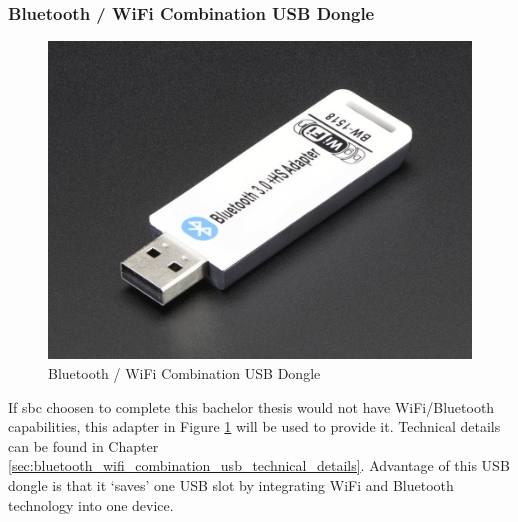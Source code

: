 \subsubsection{Bluetooth / WiFi Combination USB Dongle} %
\label{ssub:bluetooth_wifi_combination_usb_dongle}
\begin{figure}[H]
\begin{center}
\captionsetup{font=small}
\includegraphics[scale=0.2]{pics/dongle.jpg}
\caption{Bluetooth / WiFi Combination USB Dongle\cite{wifi_pic}}
\label{fig:wifi}
\end{center}
\end{figure}
If \gls{sbc} choosen to complete this bachelor thesis would not have WiFi/Bluetooth capabilities, this adapter in Figure \ref{fig:wifi} will be used to provide it. Technical details can be found in Chapter \ref{sec:bluetooth_wifi_combination_usb_technical_details}. Advantage of this USB dongle is that it `saves' one USB slot by integrating WiFi and Bluetooth technology into one device.
